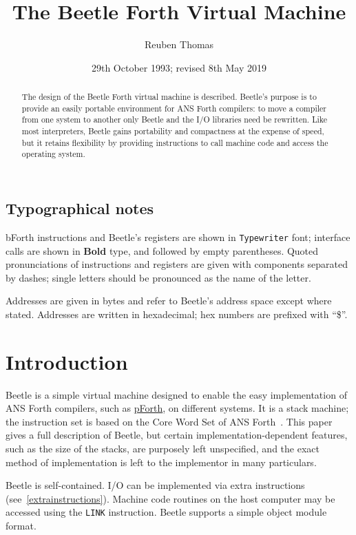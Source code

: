 \documentclass{article}
\title{The Beetle Forth Virtual Machine}
\author{Reuben Thomas}
\date{29th October 1993; revised 8th May 2019}
\newlength{\pronunc}\pronunc=1.7in
\begin{document}
\maketitle

\begin{abstract}
\noindent The design of the Beetle Forth virtual machine is described.
Beetle's purpose is to provide an easily portable environment for ANS Forth
compilers: to move a compiler from one system to another only Beetle and the I/O
libraries need be rewritten. Like most interpreters, Beetle gains portability
and compactness at the expense of speed, but it retains flexibility by providing
instructions to call machine code and access the operating system.
\end{abstract}


\subsection*{Typographical notes}

bForth instructions and Beetle's registers are shown in {\tt Typewriter} font;
interface calls are shown in {\bf Bold} type, and followed by empty parentheses.
Quoted pronunciations of instructions and registers are given with components
separated by dashes; single letters should be pronounced as the name of the
letter.

Addresses are given in bytes and refer to Beetle's address space except where
stated. Addresses are written in hexadecimal; hex numbers are prefixed with
“\$”.


\section{Introduction}

Beetle is a simple virtual machine designed to enable the easy implementation
of ANS Forth compilers, such as \href{https://github.com/rrthomas/pforth}{pForth}, on different systems. It is a stack machine; the instruction set is based on the Core Word Set of
ANS Forth~\cite{ANSIforth}. This paper gives a full description of Beetle, but
certain implementation-dependent features, such as the size of the stacks, are
purposely left unspecified, and the exact method of implementation is left to
the implementor in many particulars.

Beetle is self-contained. I/O can be implemented via extra instructions (see~\ref{extrainstructions}). Machine
code routines on the host computer may be accessed using the {\tt LINK}
instruction. Beetle supports a simple object module format.
\end{document}

